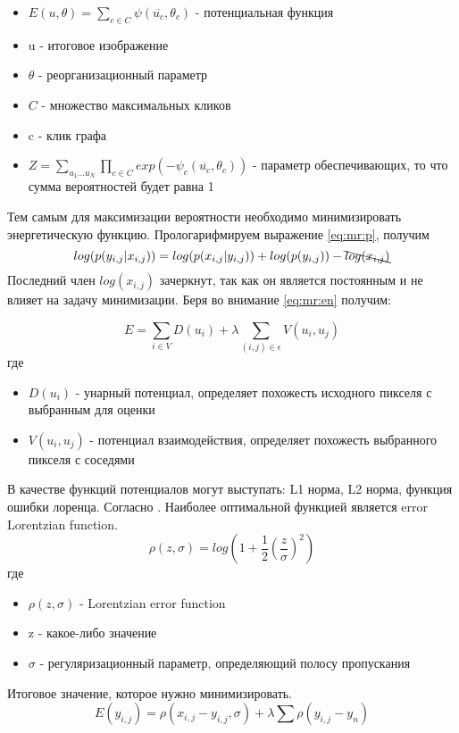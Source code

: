 \begin{itemize}
	\item $E(u,\theta) = \sum_{c\in C}\psi(\overline{u_c},\theta_c)$ - потенциальная функция
	\item u - итоговое изображение
	\item $\theta$ - реорганизационный параметр
	\item $C$ -  множество максимальных кликов
	\item c - клик графа
	\item $Z = \sum_{u_1...u_N}\prod_{c\in C}exp(-\psi_c(\overline{u_c}, \theta_c))$ - параметр обеспечивающих, то что сумма вероятностей будет равна 1
\end{itemize}
Тем самым для максимизации вероятности необходимо минимизировать энергетическую функцию. Прологарифмируем выражение \ref{eq:mr:p}, получим
\begin{equation}
	log(p(y_{i,j}|x_{i,j})) = log(p(x_{i,j}|y_{i,j})) + log(p(y_{i,j})) -\bcancel{log(x_{i,j})}
\end{equation}
Последний член $log(x_{i,j})$ зачеркнут, так как он является постоянным и не влияет на задачу минимизации. Беря во внимание \ref{eq:mr:en} получим:

\begin{equation}
E = \sum_{i\in V}D(u_i) + \lambda\sum_{(i,j)\in\epsilon}V(u_i,u_j)
\end{equation}
где
\begin{itemize}
	\item $D(u_i)$ - унарный потенциал, определяет похожесть исходного пикселя с выбранным для оценки
	\item $V(u_i,u_j)$ - потенциал взаимодействия, определяет похожесть выбранного пикселя с соседями
\end{itemize}

В качестве функций потенциалов могут выступать: L1 норма, L2 норма, функция ошибки лоренца. 
Согласно \cite{}. Наиболее оптимальной функцией является error Lorentzian function. 
\begin{equation}\label{eq:mr:l}
	\rho(z,\sigma) = log(1 + \frac{1}{2}(\frac{z}{\sigma})^2)
\end{equation}
где
\begin{itemize}
	\item $\rho(z,\sigma)$ - Lorentzian error function
	\item z - какое-либо значение
	\item $\sigma$ - регуляризационный параметр, определяющий полосу пропускания
\end{itemize}

Итоговое значение, которое нужно минимизировать.
\begin{equation}
	E(y_{i,j})= \rho(x_{i,j} - y_{i,j}, \sigma) + \lambda\sum \rho(y_{i,j}-y_n)
\end{equation}